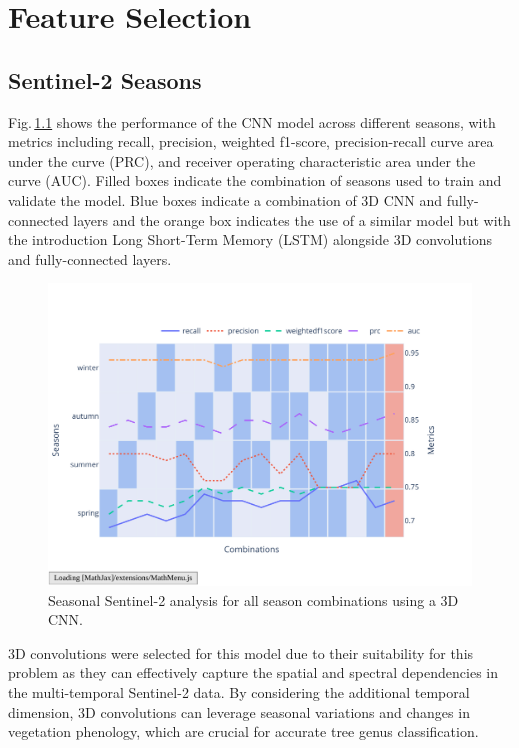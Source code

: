 \chapter{Feature Selection}
\label{chapter:analysis}

\section{Sentinel-2 Seasons}
\label{section:seasonal}

Fig.\,\ref{fig:seasonal_selection} shows the performance of the CNN model across different seasons, with metrics including recall, precision, weighted f1-score, precision-recall curve area under the curve (PRC), and receiver operating characteristic area under the curve (AUC). Filled boxes indicate the combination of seasons used to train and validate the model. Blue boxes indicate a combination of 3D CNN and fully-connected layers and the orange box indicates the use of a similar model but with the introduction Long Short-Term Memory (LSTM) alongside 3D convolutions and fully-connected layers.

\begin{figure}[ht]
    \centering
    \includegraphics[width=0.9\linewidth, trim={20pt 40pt 10pt 30pt}, clip]{figures/figures_analysis/seasonal_selection.pdf}
    \caption{Seasonal Sentinel-2 analysis for all season combinations using a 3D CNN.}
    \label{fig:seasonal_selection}
\end{figure}

3D convolutions were selected for this model due to their suitability for this problem as they can effectively capture the spatial and spectral dependencies in the multi-temporal Sentinel-2 data. By considering the additional temporal dimension, 3D convolutions can leverage seasonal variations and changes in vegetation phenology, which are crucial for accurate tree genus classification.

